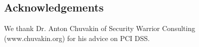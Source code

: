 \subsection*{Acknowledgements{\label{sec:acknowledgements}}}

We thank Dr. Anton Chuvakin of Security Warrior Consulting
(www.chuvakin.org) for his advice on PCI DSS.













